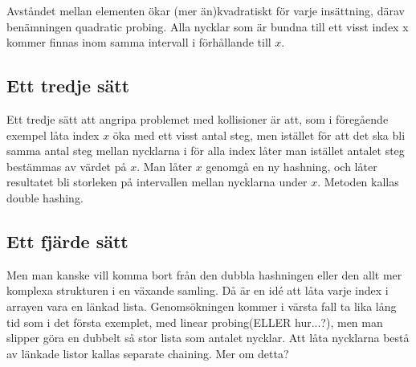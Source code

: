 \documentclass[a5paper,10pt,oneside]{article}
\begin{document}
Avståndet mellan elementen ökar (mer än)kvadratiskt för varje insättning, därav benämningen quadratic probing. Alla nycklar som är bundna till ett visst index x kommer finnas inom samma intervall i förhållande till $x$.

\subsection*{Ett tredje sätt}
Ett tredje sätt att angripa problemet med kollisioner är att, som i föregående exempel låta index $x$ öka med ett visst antal steg, men istället för att det ska bli samma antal steg mellan nycklarna i för alla index låter man istället antalet steg bestämmas av värdet på $x$.
Man låter $x$ genomgå en ny hashning, och låter resultatet bli storleken på intervallen mellan nycklarna under $x$. Metoden kallas double hashing.



\subsection*{Ett fjärde sätt}
Men man kanske vill komma bort från den dubbla hashningen eller den allt mer komplexa strukturen i en växande samling. Då är en idé att låta varje index i arrayen vara en länkad lista. Genomsökningen kommer i värsta fall ta lika lång tid som i det första exemplet, med linear probing(ELLER hur...?), men man slipper göra en dubbelt så stor lista som antalet nycklar. Att låta nycklarna bestå av länkade listor kallas separate chaining. Mer om detta?
\end{document}
